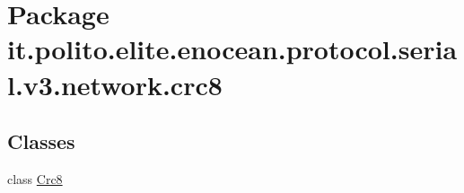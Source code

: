 \hypertarget{namespaceit_1_1polito_1_1elite_1_1enocean_1_1protocol_1_1serial_1_1v3_1_1network_1_1crc8}{}\section{Package it.\+polito.\+elite.\+enocean.\+protocol.\+serial.\+v3.\+network.\+crc8}
\label{namespaceit_1_1polito_1_1elite_1_1enocean_1_1protocol_1_1serial_1_1v3_1_1network_1_1crc8}
\subsection*{Classes}
\begin{DoxyCompactItemize}
\item 
class \hyperlink{classit_1_1polito_1_1elite_1_1enocean_1_1protocol_1_1serial_1_1v3_1_1network_1_1crc8_1_1_crc8}{Crc8}
\end{DoxyCompactItemize}
